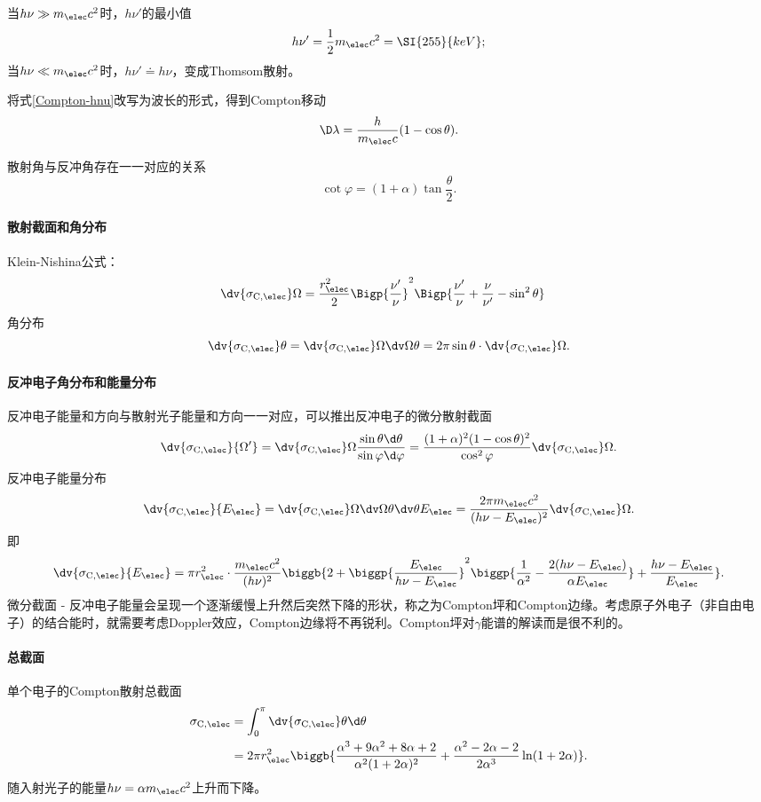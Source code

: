 当$h\nu\gg m_\elec c^2$时，$h\nu'$的最小值
\[
	h\nu'=\frac12m_\elec c^2=\SI{255}{keV};
\]
当$h\nu\ll m_\elec c^2$时，$h\nu'\doteq h\nu$，变成Thomsom散射。

将式\eqref{Compton-hnu}改写为波长的形式，得到Compton移动
\begin{align}
	\D\lambda=\frac h{m_\elec c}(1-\cos\theta).
\end{align}

散射角与反冲角存在一一对应的关系
\[
	\cot\varphi=(1+\alpha)\tan\frac\theta{2}.
\]

\paragraph{散射截面和角分布}
Klein-Nishina公式：
\begin{align*}
	\dv{\sigma_{\mathrm C,\elec}}\Omega&=\frac{r_\elec^2}2\Bigp{\frac{\nu'}\nu}^2\Bigp{\frac{\nu'}\nu+\frac\nu{\nu'}-\sin^2\theta}
\end{align*}
角分布
\[
	\dv{\sigma_{\mathrm C,\elec}}\theta=\dv{\sigma_{\mathrm C,\elec}}\Omega\dv\Omega\theta=2\pi\sin\theta\cdot\dv{\sigma_{\mathrm C,\elec}}\Omega.
\]
\paragraph{反冲电子角分布和能量分布}
反冲电子能量和方向与散射光子能量和方向一一对应，可以推出反冲电子的微分散射截面
\[
	\dv{\sigma_{\mathrm C,\elec}}{\Omega'}=\dv{\sigma_{\mathrm C,\elec}}\Omega\frac{\sin\theta\d\theta}{\sin\varphi\d\varphi}=\frac{(1+\alpha)^2(1-\cos\theta)^2}{\cos^2\varphi}\dv{\sigma_{\mathrm C,\elec}}\Omega.
\]
反冲电子能量分布
\[
	\dv{\sigma_{\mathrm C,\elec}}{E_\elec}=\dv{\sigma_{\mathrm C,\elec}}\Omega\dv\Omega\theta\dv\theta{E_\elec}=\frac{2\pi m_\elec c^2}{(h\nu-E_\elec)^2}\dv{\sigma_{\mathrm C,\elec}}\Omega.
\]
即
\[
	\dv{\sigma_{\mathrm C,\elec}}{E_\elec}=\pi r_\elec^2\cdot\frac{m_\elec c^2}{(h\nu)^2}\biggb{2+\biggp{\frac{E_\elec}{h\nu-E_\elec}}^2\biggp{\frac1{\alpha^2}-\frac{2(h\nu-E_\elec)}{\alpha E_\elec}}+\frac{h\nu-E_\elec}{E_\elec}}.
\]
微分截面 - 反冲电子能量会呈现一个逐渐缓慢上升然后突然下降的形状，称之为Compton坪和Compton边缘。考虑原子外电子（非自由电子）的结合能时，就需要考虑Doppler效应，Compton边缘将不再锐利。Compton坪对$\gamma$能谱的解读而是很不利的。

\paragraph{总截面}单个电子的Compton散射总截面
\begin{align*}
	\sigma_{\mathrm C,\elec}&=\int_0^\pi\dv{\sigma_{\mathrm C,\elec}}\theta\d\theta\\
	&=2\pi r_\elec^2\biggb{\frac{\alpha^3+9\alpha^2+8\alpha+2}{\alpha^2(1+2\alpha)^2}+\frac{\alpha^2-2\alpha-2}{2\alpha^3}\ln(1+2\alpha)}.
\end{align*}
随入射光子的能量$h\nu=\alpha m_\elec c^2$上升而下降。

